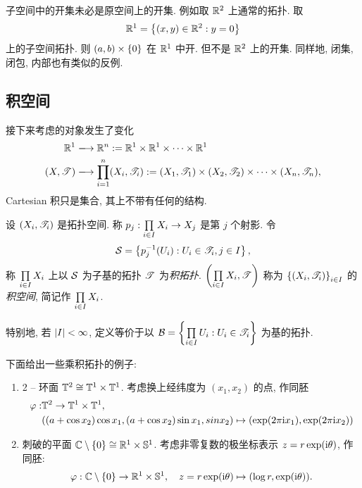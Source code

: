    \begin{Example}
        子空间中的开集未必是原空间上的开集. 例如取 $ \mathbb{R}^{2} $ 上通常的拓扑. 取
        \begin{align*}
            \mathbb{R}^{1}=\left\{ (x, y)\in\mathbb{R}^{2}: y=0 \right\}
        \end{align*}
        上的子空间拓扑. 则 $ (a, b)\times\left\{ 0 \right\} $ 在 $ \mathbb{R}^{1} $ 中开. 但不是 $ \mathbb{R}^{2} $ 上的开集. 同样地, 闭集, 闭包, 内部也有类似的反例.
    \end{Example}

\subsection{积空间}
    接下来考虑的对象发生了变化
    \begin{align*}
        \R^{1} & \xlongrightarrow{} \R^{n}:=\R^{1}\times\R^{1}\times\dots\times\R^{1}\\
        (X, \ST) & \xlongrightarrow{} \Prod{i=1}{n}(X_{i}, \ST_{i}):=(X_{1}, \ST_{1})\times(X_{2}, \ST_{2})\times\dotsb\times(X_{n}, \ST_{n}),
    \end{align*}
    Cartesian 积只是集合, 其上不带有任何的结构. 

    \begin{Definition}[乘积拓扑]
        设 $ (X_{i}, \mathscr{T}_{i}) $ 是拓扑空间. 称 $ p_{j}:\prod\limits_{i\in I}^{}X_{i}\to X_{j} $ 是第 $ j $ 个射影. 令
        \begin{align*}
            \mathcal{S}=\left\{ p_{j}^{-1}(U_{i}): U_{i}\in\mathscr{T}_{i}, j\in I \right\},
        \end{align*}
        称 $ \prod\limits_{i\in I}^{}X_{i} $ 上以 $ \mathcal{S} $ 为子基的拓扑 $ \mathscr{T} $ 为\emph{积拓扑}. $ \left( \prod\limits_{i\in I}^{}X_{i}, \mathscr{T} \right) $ 称为 $ \left\{ (X_{i}, \mathscr{T}_{i}) \right\}_{i\in I} $ 的\emph{积空间}, 简记作 $ \prod\limits_{i\in I}^{} X_{i} $.

        特别地, 若 $ \left| I \right| <\infty $, 定义等价于以 $ \mathcal{B}=\left\{ \prod\limits_{i\in I}^{}U_{i}: U_{i}\in \mathscr{T}_{i} \right\} $ 为基的拓扑.
    \end{Definition}

    \begin{Example}
        下面给出一些乘积拓扑的例子:
        \begin{enumerate}
            \item 2 -- 环面 $ \mathbb{T}^{2}\cong \mathbb{T}^{1}\times\mathbb{T}^{1} $. 考虑换上经纬度为 $ (x_{1}, x_{2}) $ 的点, 作同胚
            \begin{align*}
                \varphi: & \mathbb{T}^{2} \to \mathbb{T}^{1}\times\mathbb{T}^{1}, \\
                & ((a+\cos x_{2})\cos x_{1}, (a+\cos x_{2})\sin x_{1}, sin x_{2}) \mapsto (\exp(2\pi\mathrm{i} x_{1}), \exp(2\pi\mathrm{i} x_{2}))
            \end{align*}
            \item 刺破的平面 $ \mathbb{C}\setminus\left\{ 0 \right\}\cong \mathbb{R}^{1}\times\mathbb{S}^{1} $. 考虑非零复数的极坐标表示 $ z=r\exp(\mathrm{i}\theta) $, 作同胚:
            \begin{align*}
                \varphi: \mathbb{C}\setminus \left\{ 0 \right\}\to \mathbb{R}^{1}\times \mathbb{S}^{1}, \quad z=r\exp(\mathrm{i}\theta)\mapsto(\log r, \exp(\mathrm{i}\theta)).
            \end{align*}
        \end{enumerate}
    \end{Example}

